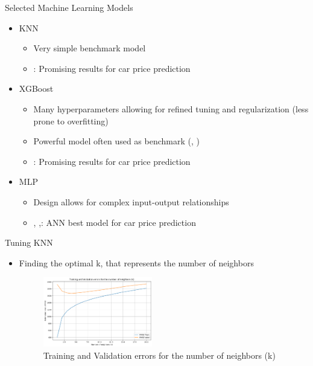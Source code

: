 \documentclass{beamer}
\begin{document}
\begin{frame}{Selected Machine Learning Models} 
    
    \begin{itemize}
        \item KNN \\[0.2 cm]
            \begin{itemize}
                \item Very simple benchmark model
                \item \cite{Samruddhi2020}: Promising results  for car price prediction
            \end{itemize}
            
            \item XGBoost \\[0.2 cm]
            \begin{itemize}
                \item Many hyperparameters allowing for refined tuning and regularization (less prone to overfitting)
                \item Powerful model often used as benchmark (\cite{flachaire2022}, \cite{Lolic2022})
                \item \cite{Gajera2021}: Promising results for car price prediction
            \end{itemize}
            
        \item MLP \\[0.2 cm]
        \begin{itemize}
                \item Design allows for complex input-output relationships
                \item \cite{Samruddhi2020}, \cite{Karakoç2020},\cite{Bilen2021}: ANN best model for car price prediction
            \end{itemize}
            
    \end{itemize}
    
\end{frame}

    \begin{frame}{Tuning KNN} 
    \begin{itemize}
        \item Finding the optimal k, that represents the number of neighbors \\[0.5 cm] 
        \begin{figure}[ht]
    \centering
    \includegraphics[width=0.45\textwidth]{Nb k.png}
    \caption{Training and Validation errors for the number of neighbors (k)}
    \label{Optimal k}
    \end{figure}
    \end{itemize}
    \end{frame}
\end{document}
